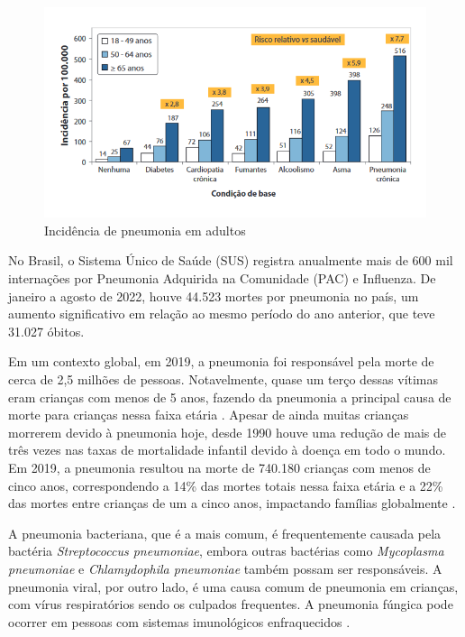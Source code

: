 \begin{figure}[!ht]
    \begin{center}
    \includegraphics[width=350pt]{pictures/incidencia.png}
    \caption{Incidência de pneumonia em adultos }
    \label{pic:stats_pneumonia}
    \end{center}
\end{figure}




No Brasil, o Sistema Único de Saúde (SUS) registra anualmente mais de 600 mil internações por Pneumonia Adquirida na Comunidade (PAC) e Influenza. De janeiro a agosto de 2022, houve 44.523 mortes por pneumonia no país, um aumento significativo em relação ao mesmo período do ano anterior, que teve 31.027 óbitos. \cite{bvsmsDiaMundialPneumonia}

Em um contexto global, em 2019, a pneumonia foi responsável pela morte de cerca de 2,5 milhões de pessoas. Notavelmente, quase um terço dessas vítimas eram crianças com menos de 5 anos, fazendo da pneumonia a principal causa de morte para crianças nessa faixa etária . Apesar de ainda muitas crianças morrerem devido à pneumonia hoje, desde 1990 houve uma redução de mais de três vezes nas taxas de mortalidade infantil devido à doença em todo o mundo.\cite{OurWorldInDataPneumonia} Em 2019, a pneumonia resultou na morte de 740.180 crianças com menos de cinco anos, correspondendo a 14\% das mortes totais nessa faixa etária e a 22\% das mortes entre crianças de um a cinco anos, impactando famílias globalmente \cite{WHO2023Pneumonia}. 

A pneumonia bacteriana, que é a mais comum, é frequentemente causada pela bactéria \textit{Streptococcus pneumoniae}, embora outras bactérias como \textit{Mycoplasma pneumoniae} e \textit{Chlamydophila pneumoniae} também possam ser responsáveis. A pneumonia viral, por outro lado, é uma causa comum de pneumonia em crianças, com vírus respiratórios sendo os culpados frequentes. A pneumonia fúngica pode ocorrer em pessoas com sistemas imunológicos enfraquecidos \cite{WHO2023Pneumonia}.


